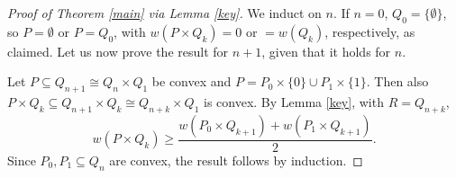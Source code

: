 \documentclass[10pt,a4paper]{amsart}
\begin{document}
\begin{proof}[Proof of Theorem \ref{main} via Lemma \ref{key}]
    We induct on $n$. If $n=0$, $Q_0=\{\emptyset\}$, so $P=\emptyset$ or $P=Q_0$, with $w(P\times Q_k)=0$ or $=w(Q_k)$, respectively, as claimed. Let us now prove the result for $n+1$, given that it holds for $n$.

    Let $P\subseteq Q_{n+1}\cong Q_n\times Q_1$ be convex and $P=P_0\times \{0\}\cup P_1\times\{1\}$. Then also $P\times Q_k\subseteq Q_{n+1}\times Q_k\cong Q_{n+k}\times Q_1$ is convex. By Lemma \ref{key}, with $R=Q_{n+k}$,
    $$w(P\times Q_k)\ge \frac{w(P_0\times Q_{k+1})+w(P_1\times Q_{k+1})}{2}.$$
    Since $P_0,P_1\subseteq Q_n$ are convex, the result follows by induction.    
\end{proof}
\end{document}
